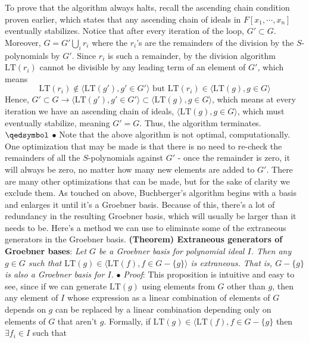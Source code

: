 \documentclass{article}
\begin{document}
\newline
\indent To prove that the algorithm always halts, recall the ascending chain condition proven earlier, which states that any ascending chain of ideals in $ F[x_1, \cdots, x_n] $ eventually stabilizes. Notice that after every iteration of the loop, $ G' \subset G $. Moreover, $ G = G' \bigcup_i r_i $ where the $ r_i $'s are the remainders of the division by the $ S $-polynomials by $ G' $. Since $ r_i $ is such a remainder, by the division algorithm $ \text{LT}(r_i) $ cannot be divisible by any leading term of an element of $ G' $, which means
$$ \text{LT}(r_i) \notin \langle \text{LT}(g'), g' \in G' \rangle \text{ but } \text{LT}(r_i) \in \langle \text{LT}(g), g \in G \rangle $$
Hence, $ G' \subset G \rightarrow \langle \text{LT}(g'), g' \in G' \rangle \subset \langle \text{LT}(g), g \in G \rangle $, which means at every iteration we have an ascending chain of ideals, $ \langle \text{LT}(g), g \in G \rangle $, which must eventually stabilize, meaning $ G' = G $. Thus, the algorithm terminates. $ \qedsymbol $
\newline
\indent $ \bullet $ Note that the above algorithm is not optimal, computationally. One optimization that may be made is that there is no need to re-check the remainders of all the $ S $-polynomials against $ G' $ - once the remainder is zero, it will always be zero, no matter how many new elements are added to $ G' $. There are many other optimizations that can be made, but for the sake of clarity we exclude them.
\newline \newline
As touched on above, Buchberger's algorithm begins with a basis and enlarges it until it's a Groebner basis. Because of this, there's a lot of redundancy in the resulting Groebner basis, which will usually be larger than it needs to be. Here's a method we can use to eliminate some of the extraneous generators in the Groebner basis.
\newline \newline
\textbf{(Theorem) Extraneous generators of Groebner bases}: \textit{Let $ G $ be a Groebner basis for polynomial ideal $ I $. Then any $ g \in G $ such that $ \text{LT}(g) \in \langle \text{LT}(f), f \in G - \{ g \} \rangle $ is extraneous. That is, $ G - \{ g \} $ is also a Groebner basis for $ I $.}
\newline
\indent $ \bullet $ \textit{Proof}: This proposition is intuitive and easy to see, since if we can generate $ \text{LT}(g) $ using elements from $ G $ other than $ g $, then any element of $ I $ whose expression as a linear combination of elements of $ G $ depends on $ g $ can be replaced by a linear combination depending only on elements of $ G $ that aren't $ g $. Formally, if $ \text{LT}(g) \in \langle \text{LT}(f), f \in G - \{ g \} $ then $ \exists f_i \in I $ such that
\end{document}
